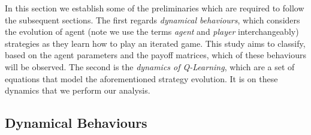 \documentclass[sigconf,anonymous]{aamas}
\begin{document}
In this section we establish some of the preliminaries which
are required to follow the subsequent sections. The first regards
\textit{dynamical behaviours}, which considers the evolution of agent (note we use the terms \textit{agent} and \textit{player} interchangeably)
strategies as they learn how to play an iterated game. This study aims to
classify, based on the agent parameters and the payoff matrices, which
of these behaviours will be observed. The second is the \textit{dynamics
  of Q-Learning}, which are a set of equations that model the
aforementioned strategy evolution. It is on these dynamics that we
perform our analysis.

\subsection{Dynamical Behaviours}
\label{sec::DynamicalBehaviours}
\end{document}
